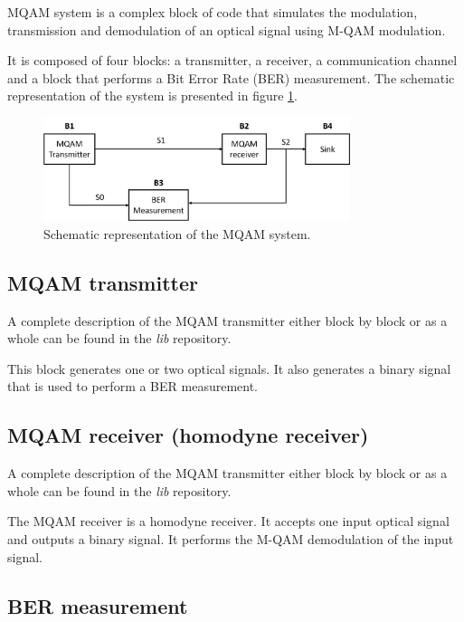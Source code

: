 
MQAM system is a complex block of code that simulates the modulation, transmission and demodulation of an optical signal using M-QAM modulation.
	
It is composed of four blocks: a transmitter, a receiver, a communication channel and a block that performs a Bit Error Rate (BER) measurement. The schematic representation of the system is presented in figure \ref{MQAM_system_block_diagram}.

\begin{figure}
	\centering
	\includegraphics[width=0.8\textwidth]{./figures/MQAM_system_block_diagram}
	\caption{Schematic representation of the MQAM system.}\label{MQAM_system_block_diagram}
\end{figure}

\subsection*{MQAM transmitter}

A complete description of the MQAM transmitter either block by block or as a whole can be found in the \textit{lib} repository. 

This block generates one or two optical signals. It also generates a binary signal that is used to perform a BER measurement.

\subsection*{MQAM receiver (homodyne receiver)}

A complete description of the MQAM transmitter either block by block or as a whole can be found in the \textit{lib} repository.

The MQAM receiver is a homodyne receiver. It accepts one input optical signal and outputs a binary signal. It performs the M-QAM demodulation of the input signal.

\subsection*{BER measurement}

